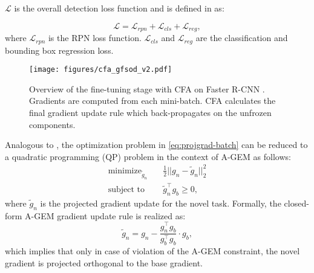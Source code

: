 \documentclass[10pt,twocolumn,letterpaper]{article}
\begin{document}
 $\mathcal{L}$ is the overall detection loss function and is defined in \cite{FasterR-CNN} as:

\begin{equation}
\label{eq:det_loss}
    \mathcal{L} = \mathcal{L}_{rpn} + \mathcal{L}_{cls} + \mathcal{L}_{reg}, 
\end{equation}
where $\mathcal{L}_{rpn}$ is the RPN loss function.  $\mathcal{L}_{cls}$ and  $\mathcal{L}_{reg}$ are the classification and bounding box regression loss. 

 \begin{figure}[t!]
 \centering
 \texttt{[image: figures/cfa\_gfsod\_v2.pdf]}
 \caption{Overview of the fine-tuning stage with CFA on Faster R-CNN \cite{FasterR-CNN}. Gradients are computed from each mini-batch. CFA calculates the final gradient update rule which back-propagates on the unfrozen components.} \vspace{-2mm}
 \label{fig:cfa_gfsod}\end{figure} Analogous to \cite{gem, agem}, the optimization problem in \cref{eq:projgrad-batch} can be reduced to a quadratic programming (QP) problem in the context of A-GEM as follows:
\begin{align}
	 	\textrm{minimize}_{\tilde{g}_n} \quad &\frac{1}{2}||g_n-\tilde{g}_n||_2^2 \nonumber\\
	 	\textrm{subject to} 				\quad &\tilde{g}_n^\top g_{b} \geq 0, \label{eq:qp_1}  
\end{align}
where $\tilde{g}_n$ is the projected gradient update for the novel task. Formally, the closed-form A-GEM gradient update rule is realized as:
\begin{equation}
    \tilde{g}_n =   g_n - \frac{g_{n}^\top g_{b}}{g_{b}^\top g_{b}} \cdot g_{b} ,
\end{equation}
which implies that only in case of violation of the A-GEM constraint, the novel gradient is projected orthogonal to the base gradient. 
\end{document}
